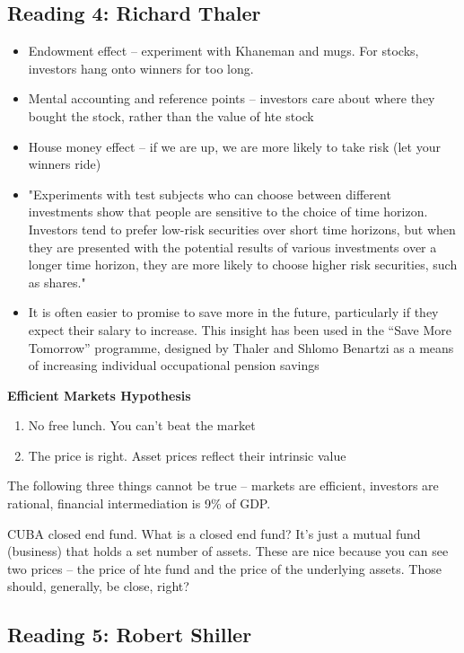 \documentclass[11pt]{article}
\theoremstyle{definition}
\begin{document}
\subsection{Reading 4: Richard Thaler}

\begin{itemize}
\item Endowment effect -- experiment with Khaneman and mugs.   For stocks, investors hang onto winners for too long.
\item Mental accounting and reference points -- investors care about where they bought the stock, rather than the value of hte stock
\item House money effect -- if we are up, we are more likely to take risk (let your winners ride)
\item "Experiments with test subjects who can choose between different investments show that people are sensitive to the choice of time horizon.  Investors tend to prefer low-risk securities over short time horizons, but when they are presented with the potential results of various investments over a longer time horizon, they are more likely to choose higher risk securities, such as shares."
\item It is often easier to promise to save more in the future, particularly if they expect their salary to increase. This insight has been used in the “Save More Tomorrow” programme, designed by Thaler and Shlomo Benartzi as a means of increasing individual occupational pension savings
\end{itemize}

\textbf{Efficient Markets Hypothesis}
\begin{enumerate}
\item No free lunch.  You can't beat the market
\item The price is right.   Asset prices reflect their intrinsic value
\end{enumerate}

The following three things cannot be true -- markets are efficient, investors are rational, financial intermediation is 9\% of GDP.

CUBA closed end fund.   What is a closed end fund?  It's just a mutual fund (business) that holds a set number of assets.   These are nice because you can see two prices -- the price of hte fund and the price of the underlying assets.  Those should, generally, be close, right?  

\subsection{Reading 5: Robert Shiller}
\end{document}

